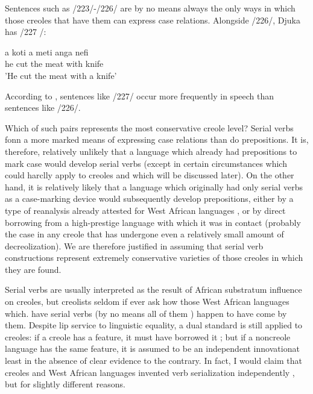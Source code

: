 Sentences such as /223/-/226/ are by no means always the only ways in which those creoles that have them can express case relations. Alongside /226/, Djuka has /227 /:

\ea\label{ex:227}
\gll a koti a meti anga nefi\\
he cut the meat with knife\\
\glt 'He cut the meat with a knife'
\z




According to \citet{Huttar1975}, sentences like /227/ occur more fre\-quently in speech than sentences like /226/.

Which of such pairs represents the most conservative creole
level? Serial verbs fonn a more marked means of expressing case rela\-tions than do prepositions. It is, therefore, relatively unlikely that a language which already had prepositions to mark case would develop serial verbs (except in certain circumstances which could harclly apply
to creoles and which will be discussed later). On the other hand, it is
relatively likely that a language which originally had only serial verbs as a case-marking device would subsequently develop prepositions, either by a type of reanalysis already attested for West African lan\-guages \citep{Lord1976}, or by direct borrowing from a high-prestige lan\-guage with which it was in contact (probably the case in any creole
that has undergone even a relatively small amount of decreolization). We are therefore justified in assuming that serial verb constructions represent extremely conservative varieties of those creoles in which they are found.

Serial verbs are usually interpreted as the result of African substratum influence on creoles, but creolists seldom if ever ask how those West African languages which. have serial verbs (by no means all of them ) happen to have come by them. Despite lip service to linguistic equality, a dual standard is still applied to creoles: if a creole has a feature, it must have borrowed it ; but if a noncreole language has the same feature, it is assumed to be an independent innovation\-at least in the absence of clear evidence to the contrary. In fact, I would claim that creoles and West African languages invented verb serialization independently , but for slightly different reasons.

